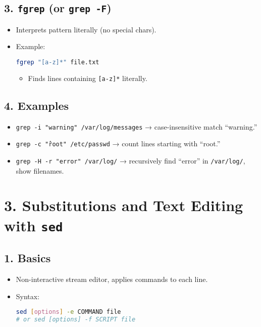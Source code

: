 \documentclass[a4paper]{report}
\begin{document}
\subsection*{3. \texttt{fgrep} (or \texttt{grep -F})}
\begin{itemize}
    \item Interprets pattern literally (no special chars).
    \item Example:
\begin{lstlisting}[language=bash]
fgrep "[a-z]*" file.txt
\end{lstlisting}
    \begin{itemize}
        \item Finds lines containing \texttt{[a-z]*} literally.
    \end{itemize}
\end{itemize}

\subsection*{4. Examples}
\begin{itemize}
    \item \texttt{grep -i "warning" /var/log/messages} → case-insensitive match “warning.”
    \item \texttt{grep -c "\^root" /etc/passwd} → count lines starting with “root.”
    \item \texttt{grep -H -r "error" /var/log/} → recursively find “error” in \texttt{/var/log/}, show filenames.
\end{itemize}


\section*{3. Substitutions and Text Editing with \texttt{sed}}

\subsection*{1. Basics}
\begin{itemize}
    \item Non-interactive stream editor, applies commands to each line.
    \item Syntax:
\begin{lstlisting}[language=bash]
sed [options] -e COMMAND file
# or sed [options] -f SCRIPT file
\end{lstlisting}
\end{itemize}
\end{document}
